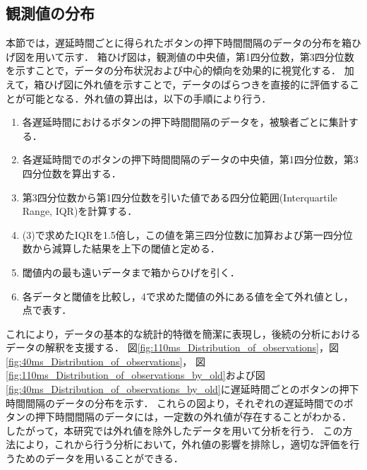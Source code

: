 \subsection{観測値の分布}
本節では，遅延時間ごとに得られたボタンの押下時間間隔のデータの分布を箱ひげ図を用いて示す．
箱ひげ図は，観測値の中央値，第1四分位数，第3四分位数を示すことで，データの分布状況および中心的傾向を効果的に視覚化する．
加えて，箱ひげ図に外れ値を示すことで，データのばらつきを直接的に評価することが可能となる．外れ値の算出は，以下の手順により行う．
\begin{enumerate}
  \item 各遅延時間におけるボタンの押下時間間隔のデータを，被験者ごとに集計する．
  \item 各遅延時間でのボタンの押下時間間隔のデータの中央値，第1四分位数，第3四分位数を算出する．
  \item 第3四分位数から第1四分位数を引いた値である四分位範囲(Interquartile Range, IQR)を計算する．
  \item (3)で求めたIQRを1.5倍し，この値を第三四分位数に加算および第一四分位数から減算した結果を上下の閾値と定める．
  \item 閾値内の最も遠いデータまで箱からひげを引く．
  \item 各データと閾値を比較し，4で求めた閾値の外にある値を全て外れ値とし，点で表す．
\end{enumerate}
これにより，データの基本的な統計的特徴を簡潔に表現し，後続の分析におけるデータの解釈を支援する．
図\ref{fig:110ms_Distribution_of_observations}，図\ref{fig:40ms_Distribution_of_observations}，
図\ref{fig:110ms_Distribution_of_observations_by_old}および図\ref{fig:40ms_Distribution_of_observations_by_old}に遅延時間ごとのボタンの押下時間間隔のデータの分布を示す．
これらの図より，それぞれの遅延時間でのボタンの押下時間間隔のデータには，一定数の外れ値が存在することがわかる．
したがって，本研究では外れ値を除外したデータを用いて分析を行う．
この方法により，これから行う分析において，外れ値の影響を排除し，適切な評価を行うためのデータを用いることができる．

